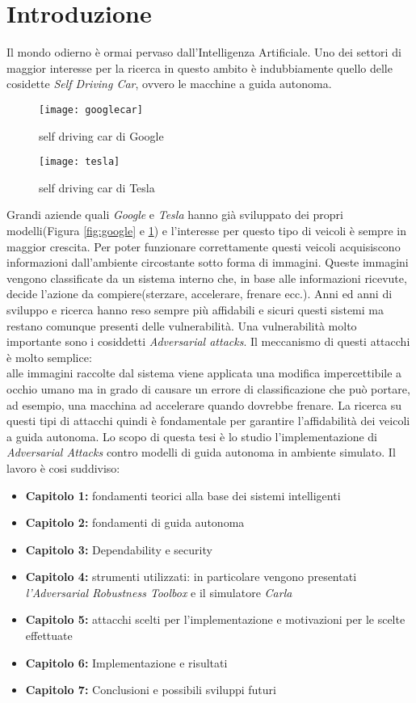 \chapter*{Introduzione}
Il mondo odierno è ormai pervaso dall'Intelligenza Artificiale. Uno dei settori di maggior interesse per la
ricerca in questo ambito è indubbiamente quello delle cosidette \emph{Self Driving Car}, ovvero
le macchine a guida autonoma. 
\begin{figure}
  \centering
  \parbox{5cm}{
  \texttt{[image: googlecar]}
  \caption{self driving car di Google}
  \label{fig:google}}
  \qquad
  \begin{minipage}{5cm}
  \texttt{[image: tesla]}
  \caption{self driving car di Tesla}
  \label{fig:tesla}
  \end{minipage}
  \end{figure}
Grandi aziende quali \emph{Google} e \emph{Tesla} hanno già sviluppato
dei propri modelli(Figura \ref{fig:google} e \ref{fig:tesla}) e l'interesse per questo tipo di veicoli è sempre in  maggior crescita.
Per poter funzionare correttamente questi veicoli acquisiscono informazioni dall'ambiente circostante sotto forma di immagini.
Queste immagini vengono classificate da un sistema interno che, in base alle informazioni ricevute, decide l'azione da compiere(sterzare, accelerare, frenare ecc.).
Anni ed anni di sviluppo e ricerca hanno reso sempre più affidabili e sicuri  questi sistemi ma restano comunque presenti delle vulnerabilità. Una vulnerabilità
molto importante sono i cosiddetti \emph{Adversarial attacks}. Il meccanismo di questi attacchi è molto semplice:
\\
alle immagini raccolte dal sistema viene applicata una modifica impercettibile a occhio umano ma in grado di causare un errore di classificazione che può portare, ad esempio, una macchina ad accelerare quando
dovrebbe frenare. La ricerca su questi tipi di attacchi quindi è fondamentale per garantire l'affidabilità dei veicoli a guida autonoma.
Lo scopo di questa tesi è lo studio l'implementazione di \emph{Adversarial Attacks} contro modelli di guida autonoma in ambiente simulato.
Il lavoro è cosi suddiviso:
\begin{itemize}
  \item \textbf{Capitolo 1:} fondamenti teorici alla base dei sistemi intelligenti
  \item \textbf{Capitolo 2:} fondamenti di guida autonoma
  \item \textbf{Capitolo 3:} Dependability e security
  \item \textbf{Capitolo 4:} strumenti utilizzati: in particolare vengono presentati \emph{l'Adversarial Robustness Toolbox} e il simulatore \emph{Carla}
  \item \textbf{Capitolo 5:} attacchi scelti per l'implementazione e  motivazioni per le scelte effettuate
  \item \textbf{Capitolo 6:} Implementazione e risultati
  \item \textbf{Capitolo 7:} Conclusioni e possibili sviluppi futuri
  
\end{itemize}


